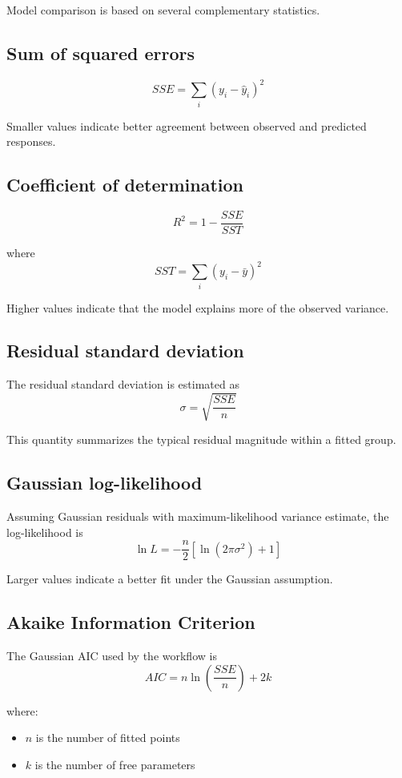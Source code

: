 \documentclass[11pt]{article}
\begin{document}
Model comparison is based on several complementary statistics.

\subsection{Sum of squared errors}

\[
SSE = \sum_i (y_i-\hat{y}_i)^2
\]

Smaller values indicate better agreement between observed and predicted responses.

\subsection{Coefficient of determination}

\[
R^2 = 1-\frac{SSE}{SST}
\]

where
\[
SST = \sum_i (y_i-\bar{y})^2
\]

Higher values indicate that the model explains more of the observed variance.

\subsection{Residual standard deviation}

The residual standard deviation is estimated as
\[
\sigma = \sqrt{\frac{SSE}{n}}
\]

This quantity summarizes the typical residual magnitude within a fitted group.

\subsection{Gaussian log-likelihood}

Assuming Gaussian residuals with maximum-likelihood variance estimate, the log-likelihood is
\[
\ln L =
-\frac{n}{2}
\left[
\ln(2\pi \sigma^2) + 1
\right]
\]

Larger values indicate a better fit under the Gaussian assumption.

\subsection{Akaike Information Criterion}

The Gaussian AIC used by the workflow is
\[
AIC = n\ln\left(\frac{SSE}{n}\right) + 2k
\]

where:
\begin{itemize}[leftmargin=1.5em]
\item $n$ is the number of fitted points
\item $k$ is the number of free parameters
\end{itemize}
\end{document}
